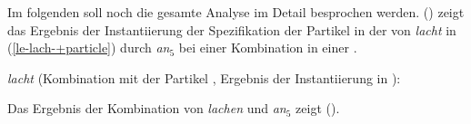 Im folgenden soll noch die gesamte Analyse im Detail besprochen werden. () zeigt das Ergebnis
der Instantiierung der Spezifikation der Partikel in der \subcatl
von \emph{lacht} in (\ref{le-lach-+particle}) durch \emph{an}$_5$ bei einer Kombination in einer
.
\newsavebox{\boxxcompdrei}
\ea
\begin{minipage}[t]{\linewidth}
\emph{lacht} (Kombination mit der Partikel \anf, Ergebnis der Instantiierung in \subcat):\\
\end{minipage}
\z
Das Ergebnis der Kombination von \emph{lachen} und \emph{an$_5$} zeigt ().

